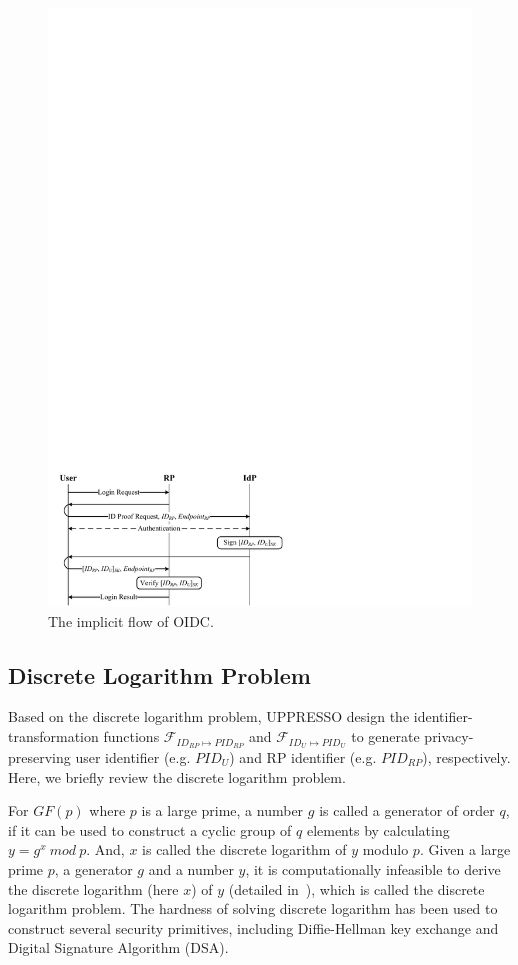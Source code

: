 \begin{figure}[t]
  \centering
  \includegraphics[width=0.95\linewidth]{fig/OIDC1.pdf}
  \caption{The implicit flow of OIDC.}
  \label{fig:OpenID}
\end{figure}

\subsection{Discrete Logarithm Problem}
\label{sec:dlp}

Based on the discrete logarithm problem, UPPRESSO design the identifier-transformation functions $\mathcal{F}_{ID_{RP} \mapsto PID_{RP}}$ and $\mathcal{F}_{ID_{U} \mapsto PID_{U}}$ to generate privacy-preserving user identifier (e.g. $PID_U$) and RP identifier (e.g. $PID_{RP}$), respectively. Here, we briefly review the discrete logarithm problem.

For $GF(p)$ where $p$ is a large prime, a number $g$ is called a generator of order $q$, if it can be used to construct a cyclic  group of $q$ elements by calculating $y=g^x \ mod\ p$.
And, $x$ is called the discrete logarithm of $y$ modulo $p$. Given a large prime $p$, a generator $g$ and a number $y$, it is computationally infeasible to derive the discrete logarithm (here $x$) of $y$ (detailed in~\cite{WXWM}), which is called the discrete logarithm problem. The hardness of solving discrete logarithm has been used to construct several security primitives, including Diffie-Hellman key exchange and Digital Signature Algorithm (DSA).

